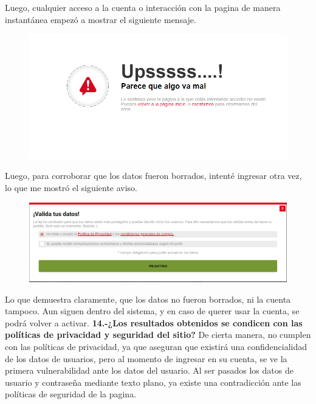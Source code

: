 \documentclass{article}
\begin{document}
Luego, cualquier acceso a la cuenta o interacción con la pagina de manera instantánea empezó a mostrar el siguiente mensaje.
\begin{figure}[h!]
    \centering
    \includegraphics[width=15cm]{paginablokiada.PNG}
\end{figure}
\newpage
Luego, para corroborar que los datos fueron borrados, intenté ingresar otra vez, lo que me mostró el siguiente aviso.

\begin{figure}[h!]
    \centering
    \includegraphics[width=15cm]{noolvida.PNG}
\end{figure}
\newline
Lo que demuestra claramente, que los datos no fueron borrados, ni la cuenta tampoco. Aun siguen dentro del sistema, y en caso de querer usar la cuenta, se podrá volver a activar. 
\newline
\textbf{14.-¿Los resultados obtenidos se condicen con las políticas de privacidad y seguridad del sitio?}
\newline
De cierta manera, no cumplen con las políticas de privacidad, ya que aseguran que existirá una confidencialidad de los datos de usuarios, pero al momento de ingresar en su cuenta, se ve la primera vulnerabilidad ante los datos del usuario. Al ser pasados los datos de usuario y contraseña mediante texto plano, ya existe una contradicción ante las políticas de seguridad de la pagina. 
\end{document}
